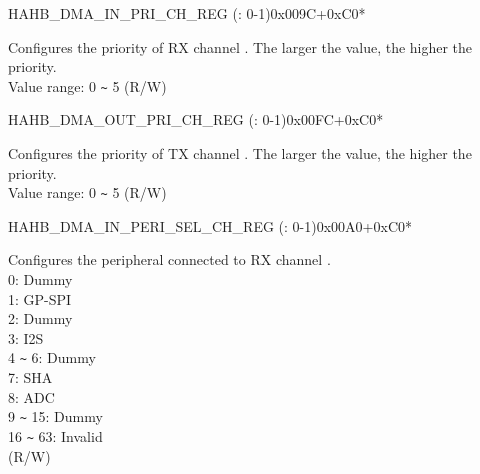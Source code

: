 \begin{register}{H}{AHB\_DMA\_IN\_PRI\_CH\_REG (: 0-1)}{0x009C+0xC0*}\label{regdesc:AHBDMAINPRICHNREG}
%
%
\regnewline%
\begin{regdesc}\begin{reglist}
\label{fielddesc:AHBDMARXPRICHN}\item [AHB\_DMA\_RX\_PRI\_CH\regindex{n}] Configures the priority of RX channel . The larger the value, the higher the priority. \\
Value range: 0  \verb+~+  5 (R/W)
\end{reglist}\end{regdesc}
\end{register}


\begin{register}{H}{AHB\_DMA\_OUT\_PRI\_CH\_REG (: 0-1)}{0x00FC+0xC0*}\label{regdesc:AHBDMAOUTPRICHNREG}
%
%
\regnewline%
\begin{regdesc}\begin{reglist}
\label{fielddesc:AHBDMATXPRICHN}\item [AHB\_DMA\_TX\_PRI\_CH\regindex{n}] Configures the priority of TX channel . The larger the value, the higher the priority. \\
Value range: 0  \verb+~+  5 (R/W)
\end{reglist}\end{regdesc}
\end{register}


\begin{register}{H}{AHB\_DMA\_IN\_PERI\_SEL\_CH\_REG (: 0-1)}{0x00A0+0xC0*}\label{regdesc:AHBDMAINPERISELCHNREG}
%
%
\regnewline%
\begin{regdesc}\begin{reglist}
\label{fielddesc:AHBDMAPERIINSELCHN}\item [AHB\_DMA\_PERI\_IN\_SEL\_CH\regindex{n}] Configures the peripheral connected to RX channel .\\
0: Dummy\\ 1: GP-SPI\\ 2: Dummy\\ 3: I2S\\ 4 \verb+~+ 6: Dummy\\ 7: SHA\\ 8: ADC\\ 9 \verb+~+ 15: Dummy\\ 16 \verb+~+ 63: Invalid\\ (R/W)
\end{reglist}\end{regdesc}
\end{register}


